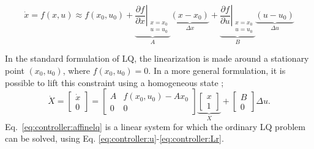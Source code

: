     \begin{equation}
        \label{eq:controller:gainscheduling:xdot}
        \dot{x} = f(x,u) \approx f(x_{0},u_{0})
            + \underbrace{\left. \frac{\partial f}{\partial x} \right|_{
                \begin{array}{l}
                    x=x_{0} \\
                    u=u_{0}
                \end{array}
            }}_{A}
                \underbrace{\left( x-x_{0} \right)}_{\Delta x}
            + \underbrace{\left. \frac{\partial f}{\partial u} \right|_{
                \begin{array}{l}
                    x=x_{0} \\
                    u=u_{0}
                \end{array}
            }}_{B}
                \underbrace{\left( u-u_{0} \right)}_{\Delta u}
    \end{equation}

    In the standard formulation of LQ, the linearization is made
    around a stationary point $(x_{0},u_{0})$, where $f(x_{0},u_{0}) = 0$.
    In a more general formulation, it is possible to lift this constraint
    using a homogeneous state \citep{Rantzer99piecewiselinear};
    \begin{equation}
    \label{eq:controller:affinelq}
        \dot{X} = \left[
        \begin{array}{c}
            \dot{x} \\
            0
        \end{array}\right] =
        \left[
        \begin{array}{cc}
            A & f(x_{0},u_{0})-Ax_{0} \\
            0 & 0
        \end{array}\right]
        \underbrace{\left[
        \begin{array}{c}
            x \\
            1
        \end{array}\right]}_{X}
        +
        \left[
        \begin{array}{c}
            B \\
            0
        \end{array}\right]
        \Delta u.
    \end{equation}
    Eq.~\ref{eq:controller:affinelq} is a linear system for which
    the ordinary LQ problem can be solved, using Eq.
    \eqref{eq:controller:u}-\eqref{eq:controller:Lr}.

